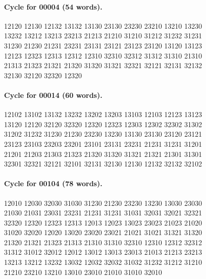 \documentclass[11pt]{article}
\theoremstyle{remark}
\numberwithin{equation}{section}
\numberwithin{table}{section}
\begin{document}
\paragraph{Cycle for 00004 (54 words).}
\begingroup\footnotesize\ttfamily\begin{flushleft}
12120 12130 12132 13132 13130 23130 23230 23210 13210 13230\\
13232 13212 13213 23213 21213 21210 31210 31212 31232 31231\\
31230 21230 21231 23231 23131 23121 23123 23120 13120 13123\\
12123 12323 12313 12312 12310 32310 32312 31312 31310 21310\\
21313 21323 21321 21320 31320 31321 32321 32121 32131 32132\\
32130 32120 32320 12320\\
\end{flushleft}\endgroup
\paragraph{Cycle for 00014 (60 words).}
\begingroup\footnotesize\ttfamily\begin{flushleft}
12102 13102 13132 13232 13202 13203 13103 12103 12123 13123\\
13120 12120 32120 32320 12320 12323 12303 12302 32302 31302\\
31202 31232 31230 21230 23230 13230 13130 23130 23120 23121\\
23123 23103 23203 23201 23101 23131 23231 21231 31231 31201\\
21201 21203 21303 21323 21320 31320 31321 21321 21301 31301\\
32301 32321 32121 32101 32131 32130 12130 12132 32132 32102\\
\end{flushleft}\endgroup
\paragraph{Cycle for 00104 (78 words).}
\begingroup\footnotesize\ttfamily\begin{flushleft}
12010 12030 32030 31030 31230 21230 23230 13230 13030 23030\\
21030 21031 23031 23231 21231 31231 31031 32031 32021 32321\\
32320 12320 12323 12313 12013 12023 13023 23023 21023 21020\\
31020 32020 12020 13020 23020 23021 21021 31021 31321 31320\\
21320 21321 21323 21313 21310 31310 32310 12310 12312 32312\\
31312 31012 32012 12012 13012 13013 23013 21013 21213 23213\\
13213 13212 13232 13032 12032 32032 31032 31232 31212 31210\\
21210 23210 13210 13010 23010 21010 31010 32010\\
\end{flushleft}\endgroup
\end{document}
